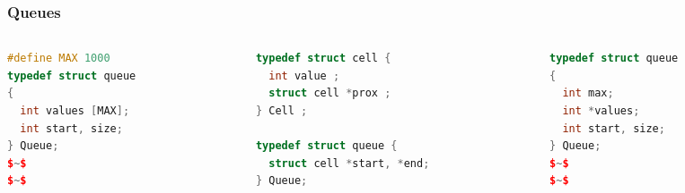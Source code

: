 \documentclass[aspectratio=169]{beamer}
\begin{document}
\begin{frame}[fragile]\frametitle{Queues}
    
\begin{columns}
\begin{column}{.29\textwidth}
%
\begin{lstlisting}[language=C++, emph={queue,Queue}]
#define MAX 1000
typedef struct queue
{
  int values [MAX];
  int start, size;
} Queue;
$~$
$~$
\end{lstlisting}
%
\end{column}
\begin{column}{.37\textwidth}
%
\begin{lstlisting}[language=C++, emph={cell,Cell,Queue}]
typedef struct cell {
  int value ;
  struct cell *prox ;
} Cell ;

typedef struct queue {
  struct cell *start, *end;
} Queue;
\end{lstlisting}
%
\end{column}
\begin{column}{.29\textwidth}
%
\begin{lstlisting}[language=C++, emph={queue,Queue}]
typedef struct queue
{
  int max;
  int *values;
  int start, size;
} Queue;
$~$
$~$
\end{lstlisting}
%
\end{column}
\end{columns}


\end{frame}



    

  
\end{document}
